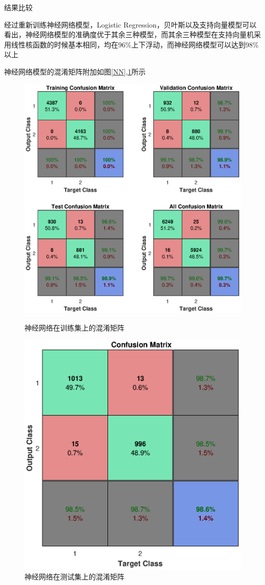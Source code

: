\documentclass[UTF8,a4paper]{ctexart}
\begin{document}
结果比较

经过重新训练神经网络模型，Logistic Regression，贝叶斯以及支持向量模型可以看出，神经网络模型的准确度优于其余三种模型，而其余三种模型在支持向量机采用线性核函数的时候基本相同，均在96\%上下浮动，而神经网络模型可以达到98\%以上

神经网络模型的混淆矩阵附加如图\ref{NN},\ref{TNN}所示

\begin{figure}
\centering 
\includegraphics[width=\textwidth]{NNconfi.eps}
\caption{神经网络在训练集上的混淆矩阵}
\label{NN}
\includegraphics[width=\textwidth]{NNTconfu.eps}
\caption{神经网络在测试集上的混淆矩阵}
\label{TNN}
\end{figure}
\end{document}
